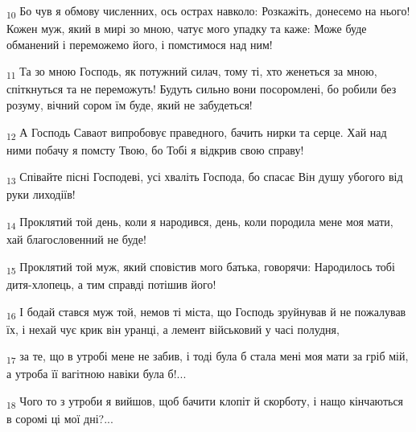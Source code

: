 \begin{tcolorbox}
\textsubscript{10} Бо чув я обмову численних, ось острах навколо: Розкажіть, донесемо на нього! Кожен муж, який в мирі зо мною, чатує мого упадку та каже: Може буде обманений і переможемо його, і помстимося над ним!
\end{tcolorbox}
\begin{tcolorbox}
\textsubscript{11} Та зо мною Господь, як потужний силач, тому ті, хто женеться за мною, спіткнуться та не переможуть! Будуть сильно вони посоромлені, бо робили без розуму, вічний сором їм буде, який не забудеться!
\end{tcolorbox}
\begin{tcolorbox}
\textsubscript{12} А Господь Саваот випробовує праведного, бачить нирки та серце. Хай над ними побачу я помсту Твою, бо Тобі я відкрив свою справу!
\end{tcolorbox}
\begin{tcolorbox}
\textsubscript{13} Співайте пісні Господеві, усі хваліть Господа, бо спасає Він душу убогого від руки лиходіїв!
\end{tcolorbox}
\begin{tcolorbox}
\textsubscript{14} Проклятий той день, коли я народився, день, коли породила мене моя мати, хай благословенний не буде!
\end{tcolorbox}
\begin{tcolorbox}
\textsubscript{15} Проклятий той муж, який сповістив мого батька, говорячи: Народилось тобі дитя-хлопець, а тим справді потішив його!
\end{tcolorbox}
\begin{tcolorbox}
\textsubscript{16} І бодай стався муж той, немов ті міста, що Господь зруйнував й не пожалував їх, і нехай чує крик він уранці, а лемент військовий у часі полудня,
\end{tcolorbox}
\begin{tcolorbox}
\textsubscript{17} за те, що в утробі мене не забив, і тоді була б стала мені моя мати за гріб мій, а утроба її вагітною навіки була б!...
\end{tcolorbox}
\begin{tcolorbox}
\textsubscript{18} Чого то з утроби я вийшов, щоб бачити клопіт й скорботу, і нащо кінчаються в соромі ці мої дні?...
\end{tcolorbox}
